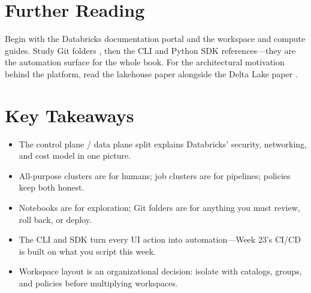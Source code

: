 \section{Further Reading}
Begin with the Databricks documentation portal \cite{databricksDocs} and the workspace \cite{databricksWorkspace} and compute \cite{databricksCompute} guides. Study Git folders \cite{databricksRepos}, then the CLI \cite{databricksCLI} and Python SDK \cite{databricksSDK} references---they are the automation surface for the whole book. For the architectural motivation behind the platform, read the lakehouse paper \cite{armbrust2021lakehouse} alongside the Delta Lake paper \cite{armbrust2020delta}.

\section*{Key Takeaways}
\begin{itemize}
    \item The control plane / data plane split explains Databricks' security, networking, and cost model in one picture.
    \item All-purpose clusters are for humans; job clusters are for pipelines; policies keep both honest.
    \item Notebooks are for exploration; Git folders are for anything you must review, roll back, or deploy.
    \item The CLI and SDK turn every UI action into automation---Week 23's CI/CD is built on what you script this week.
    \item Workspace layout is an organizational decision: isolate with catalogs, groups, and policies before multiplying workspaces.
\end{itemize}

